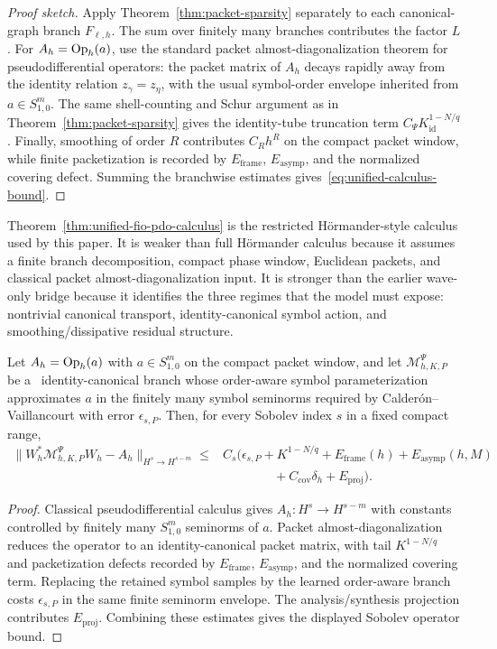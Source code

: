 \begin{proof}[Proof sketch]
Apply Theorem~\ref{thm:packet-sparsity} separately to each canonical-graph branch $F_{\ell,h}$.  The sum over finitely many branches contributes the factor $L$.  For $A_h=\operatorname{Op}_h(a)$, use the standard packet almost-diagonalization theorem for pseudodifferential operators: the packet matrix of $A_h$ decays rapidly away from the identity relation $z_\gamma=z_\eta$, with the usual symbol-order envelope inherited from $a\in S^m_{1,0}$.  The same shell-counting and Schur argument as in Theorem~\ref{thm:packet-sparsity} gives the identity-tube truncation term $C_{\Psi}K_{\mathrm{id}}^{1-N/q}$.  Finally, smoothing of order $R$ contributes $C_Rh^R$ on the compact packet window, while finite packetization is recorded by $E_{\mathrm{frame}}$, $E_{\mathrm{asymp}}$, and the normalized covering defect.  Summing the branchwise estimates gives~\eqref{eq:unified-calculus-bound}.
\end{proof}

Theorem~\ref{thm:unified-fio-pdo-calculus} is the restricted H\"ormander-style calculus used by this paper.  It is weaker than full H\"ormander calculus because it assumes a finite branch decomposition, compact phase window, Euclidean packets, and classical packet almost-diagonalization input.  It is stronger than the earlier wave-only bridge because it identifies the three regimes that the model must expose: nontrivial canonical transport, identity-canonical symbol action, and smoothing/dissipative residual structure.

\begin{corollary}
\label{cor:identity-symbol-order}
Let $A_h=\operatorname{Op}_h(a)$ with $a\in S^m_{1,0}$ on the compact packet window, and let $\mathcal M^{\Psi}_{h,K,P}$ be a \MiNO\ identity-canonical branch whose order-aware symbol parameterization approximates $a$ in the finitely many symbol seminorms required by Calder\'on--Vaillancourt with error $\epsilon_{s,P}$.  Then, for every Sobolev index $s$ in a fixed compact range,
\begin{align*}
\|W_h^\ast \mathcal M^{\Psi}_{h,K,P} W_h-A_h\|_{H^s\to H^{s-m}}
\le{}&
C_s\bigl(\epsilon_{s,P}+K^{1-N/q}+E_{\mathrm{frame}}(h)+E_{\mathrm{asymp}}(h,M)\\
&\qquad\qquad
+C_{\mathrm{cov}}\delta_h+E_{\mathrm{proj}}\bigr).
\end{align*}
\end{corollary}

\begin{proof}
Classical pseudodifferential calculus gives $A_h:H^s\to H^{s-m}$ with constants controlled by finitely many $S^m_{1,0}$ seminorms of $a$.  Packet almost-diagonalization reduces the operator to an identity-canonical packet matrix, with tail $K^{1-N/q}$ and packetization defects recorded by $E_{\mathrm{frame}}$, $E_{\mathrm{asymp}}$, and the normalized covering term.  Replacing the retained symbol samples by the learned order-aware branch costs $\epsilon_{s,P}$ in the same finite seminorm envelope.  The analysis/synthesis projection contributes $E_{\mathrm{proj}}$.  Combining these estimates gives the displayed Sobolev operator bound.
\end{proof}

